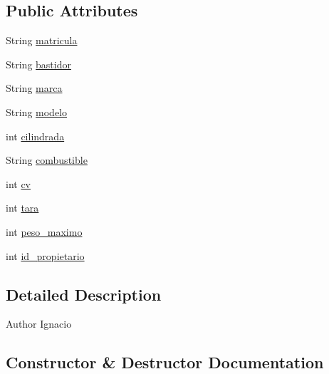 \subsection*{Public Attributes}
\begin{DoxyCompactItemize}
\item 
String \mbox{\hyperlink{classjavaapplication20_1_1_vehiculos_a00ca322d3efc66517f045c58a6858a73}{matricula}}
\item 
String \mbox{\hyperlink{classjavaapplication20_1_1_vehiculos_a8e57e42476235c0fb54d5480a4b033be}{bastidor}}
\item 
String \mbox{\hyperlink{classjavaapplication20_1_1_vehiculos_af8b537d237bd309fd6ebc5e5bd7b4469}{marca}}
\item 
String \mbox{\hyperlink{classjavaapplication20_1_1_vehiculos_a717312899a8efa6bee16a81248a85b0d}{modelo}}
\item 
int \mbox{\hyperlink{classjavaapplication20_1_1_vehiculos_ac28bed25c6d436eaf88519b8d646b7a9}{cilindrada}}
\item 
String \mbox{\hyperlink{classjavaapplication20_1_1_vehiculos_ad7c53867ff5e447d79eb96ddc307b40e}{combustible}}
\item 
int \mbox{\hyperlink{classjavaapplication20_1_1_vehiculos_a9cdd64c9b7db2fa65f174783082d7a9e}{cv}}
\item 
int \mbox{\hyperlink{classjavaapplication20_1_1_vehiculos_aae0e84c500242de0732b52eb6a941174}{tara}}
\item 
int \mbox{\hyperlink{classjavaapplication20_1_1_vehiculos_a36a9aa2b170d9892bddd74c5e0447f00}{peso\+\_\+maximo}}
\item 
int \mbox{\hyperlink{classjavaapplication20_1_1_vehiculos_a41dcb7765d0f936dc45ca9c13e3cf2f9}{id\+\_\+propietario}}
\end{DoxyCompactItemize}


\subsection{Detailed Description}
\begin{DoxyAuthor}{Author}
Ignacio 
\end{DoxyAuthor}


\subsection{Constructor \& Destructor Documentation}
\mbox{\label{classjavaapplication20_1_1_vehiculos_aed8aafbb495080709c827223e587a033}} 
